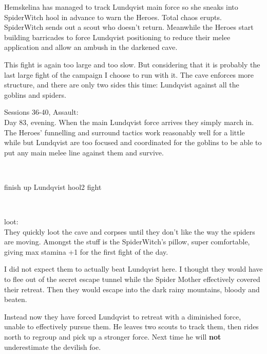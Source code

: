 Hemskelina has managed to track Lundqvist main force so she sneaks into SpiderWitch hool in advance to warn the Heroes. Total chaos erupts. SpiderWitch sends out a scout who doesn't return. Meanwhile the Heroes start building barricades to force Lundqvist positioning to reduce their melee application and allow an ambush in the darkened cave.

\begin{readoutloud}
This fight is again too large and too slow. But considering that it is probably the last large fight of the campaign I choose to run with it. The cave enforces more structure, and there are only two sides this time: Lundqvist against all the goblins and spiders.
\end{readoutloud}


Sessions 36-40, Assault:\\
Day 83, evening. When the main Lundqvist force arrives they simply march in. The Heroes' funnelling and surround tactics work reasonably well for a little while but Lundqvist are too focused and coordinated for the goblins to be able to put any main melee line against them and survive. 

\

\todo finish up Lundqvist hool2 fight

\

loot:\\
They quickly loot the cave and corpses until they don't like the way the spiders are moving. Amongst the stuff is the SpiderWitch's pillow, super comfortable, giving max stamina +1 for the first fight of the day.


\begin{readoutloud}
I did not expect them to actually beat Lundqvist here. I thought they would have to flee out of the secret escape tunnel while the Spider Mother effectively covered their retreat. Then they would escape into the dark rainy mountains, bloody and beaten.

Instead now they have forced Lundqvist to retreat with a diminished force, unable to effectively pursue them. He leaves two scouts to track them, then rides north to regroup and pick up a stronger force. Next time he will \textbf{not} underestimate the devilish foe.
\end{readoutloud}


